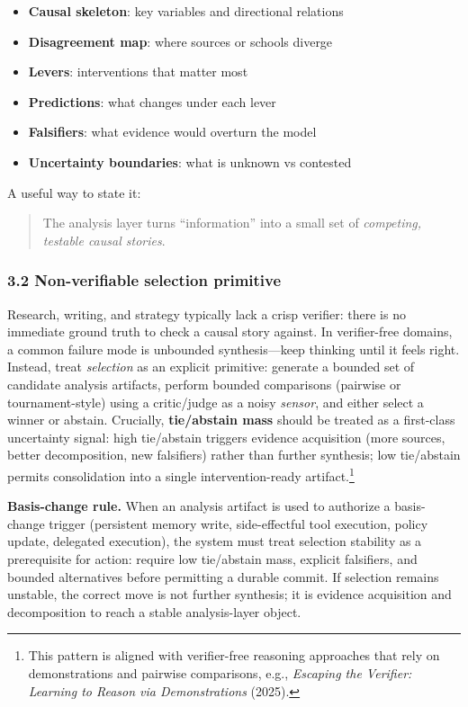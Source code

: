 \documentclass[11pt]{article}
\providecommand{\tightlist}{%
  \setlength{\itemsep}{0pt}\setlength{\parskip}{0pt}}
\begin{document}
\begin{itemize}
\tightlist
\item
  \textbf{Causal skeleton}: key variables and directional relations
\item
  \textbf{Disagreement map}: where sources or schools diverge
\item
  \textbf{Levers}: interventions that matter most
\item
  \textbf{Predictions}: what changes under each lever
\item
  \textbf{Falsifiers}: what evidence would overturn the model
\item
  \textbf{Uncertainty boundaries}: what is unknown vs contested
\end{itemize}

A useful way to state it:

\begin{quote}
The analysis layer turns ``information'' into a small set of
\emph{competing, testable causal stories}.
\end{quote}

\hypertarget{non-verifiable-selection-primitive}{%
\subsubsection{3.2 Non-verifiable selection
primitive}\label{non-verifiable-selection-primitive}}

Research, writing, and strategy typically lack a crisp verifier: there is no immediate ground truth to check a causal story against. In verifier-free domains, a common failure mode is unbounded synthesis---keep thinking until it feels right. Instead, treat \emph{selection} as an explicit primitive: generate a bounded set of candidate analysis artifacts, perform bounded comparisons (pairwise or tournament-style) using a critic/judge as a noisy \emph{sensor}, and either select a winner or abstain. Crucially, \textbf{tie/abstain mass} should be treated as a first-class uncertainty signal: high tie/abstain triggers evidence acquisition (more sources, better decomposition, new falsifiers) rather than further synthesis; low tie/abstain permits consolidation into a single intervention-ready artifact.\footnote{This pattern is aligned with verifier-free reasoning approaches that rely on demonstrations and pairwise comparisons, e.g., \emph{Escaping the Verifier: Learning to Reason via Demonstrations} (2025).}

\noindent\textbf{Basis-change rule.}
When an analysis artifact is used to authorize a basis-change trigger (persistent memory write, side-effectful tool execution, policy update, delegated execution), the system must treat selection stability as a prerequisite for action: require low tie/abstain mass, explicit falsifiers, and bounded alternatives before permitting a durable commit.
If selection remains unstable, the correct move is not further synthesis; it is evidence acquisition and decomposition to reach a stable analysis-layer object.
\end{document}
